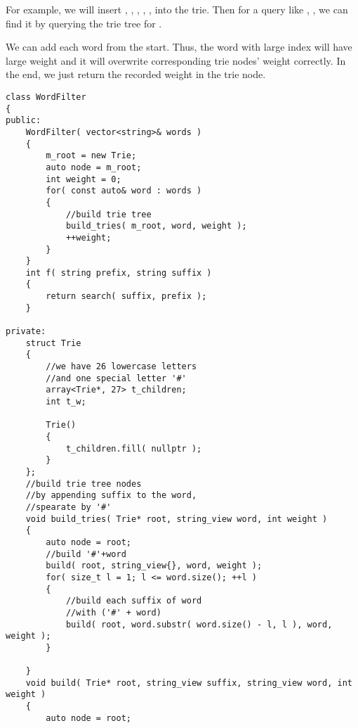 For example, we will insert , , , , ,  into the trie. Then for a query like , , we can find it by querying the trie tree for .

We can add each word from the start. Thus, the word with large index will have large weight and it will overwrite corresponding trie nodes' weight correctly. In the end, we just return the recorded weight in the trie node.

\setcounter{lstlisting}{0}
\begin{lstlisting}[style=customc, caption={Suffix Wrapped Words Trie}]
class WordFilter
{
public:
    WordFilter( vector<string>& words )
    {
        m_root = new Trie;
        auto node = m_root;
        int weight = 0;
        for( const auto& word : words )
        {
            //build trie tree
            build_tries( m_root, word, weight );
            ++weight;
        }
    }
    int f( string prefix, string suffix )
    {
        return search( suffix, prefix );
    }

private:
    struct Trie
    {
		//we have 26 lowercase letters
		//and one special letter '#'
        array<Trie*, 27> t_children;
        int t_w;

        Trie()
        {
            t_children.fill( nullptr );
        }
    };
	//build trie tree nodes
	//by appending suffix to the word,
	//spearate by '#'
    void build_tries( Trie* root, string_view word, int weight )
    {
        auto node = root;
		//build '#'+word
        build( root, string_view{}, word, weight );
        for( size_t l = 1; l <= word.size(); ++l )
        {
			//build each suffix of word
			//with ('#' + word)
            build( root, word.substr( word.size() - l, l ), word, weight );
        }

    }
    void build( Trie* root, string_view suffix, string_view word, int weight )
    {
        auto node = root;


\end{lstlisting}
